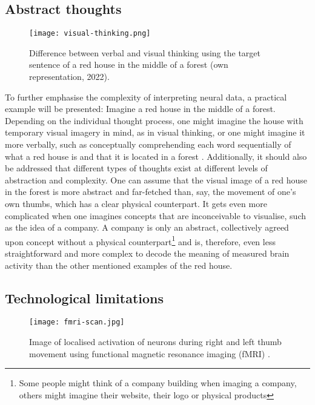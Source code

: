\subsection{Abstract thoughts}
\label{chapter2-abstract-thoughts}

\begin{figure}[ht]
  \centering
  \texttt{[image: visual-thinking.png]}
  \caption{Difference between verbal and visual thinking using the target sentence of a red house in the middle of a forest (own representation, 2022).}
  \label{fig:visual-thinking}
\end{figure}

To further emphasise the complexity of interpreting neural data, a practical example will be presented: Imagine a red house in the middle of a forest. Depending on the individual thought process, one might imagine the house with temporary visual imagery in mind, as in visual thinking, or one might imagine it more verbally, such as conceptually comprehending each word sequentially of what a red house is and that it is located in a forest \citep{amit_asymmetrical_2017}. Additionally, it should also be addressed that different types of thoughts exist at different levels of abstraction and complexity. One can assume that the visual image of a red house in the forest is more abstract and far-fetched than, say, the movement of one's own thumbs, which has a clear physical counterpart. It gets even more complicated when one imagines concepts that are inconceivable to visualise, such as the idea of a company. A company is only an abstract, collectively agreed upon concept without a physical counterpart\footnote{Some people might think of a company building when imaging a company, others might imagine their website, their logo or physical products} and is, therefore, even less straightforward and more complex to decode the meaning of measured brain activity than the other mentioned examples of the red house.

\subsection{Technological limitations}
\label{chapter2-technological-limitations}

\begin{figure}[ht]
  \centering
  \texttt{[image: fmri-scan.jpg]}
  \caption{Image of localised activation of neurons during right and left thumb movement using functional magnetic resonance imaging (fMRI) \citep{rashid_bilateral_2018}.}
  \label{fig:fmri-scan}
\end{figure}

